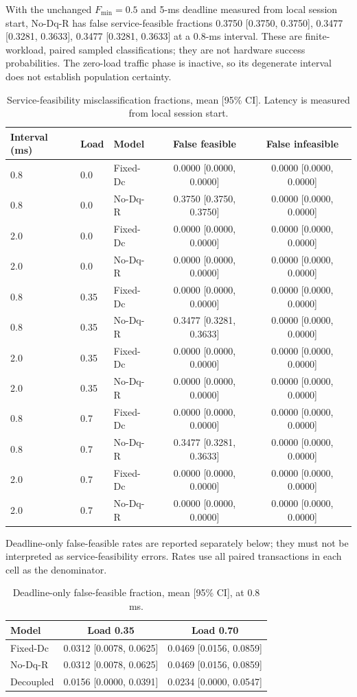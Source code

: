 With the unchanged $F_{\min}=0.5$ and 5-ms deadline measured from local session start, No-Dq-R has false service-feasible fractions 0.3750 [0.3750, 0.3750], 0.3477 [0.3281, 0.3633], 0.3477 [0.3281, 0.3633] at a 0.8-ms interval. These are finite-workload, paired sampled classifications; they are not hardware success probabilities. The zero-load traffic phase is inactive, so its degenerate interval does not establish population certainty.

\begin{table}[t]
\centering
\caption{Service-feasibility misclassification fractions, mean [95\% CI]. Latency is measured from local session start.}
\begin{tabular}{lllcc}
\hline
Interval (ms) & Load & Model & False feasible & False infeasible \\
\hline
0.8 & 0.0 & Fixed-Dc & 0.0000 [0.0000, 0.0000] & 0.0000 [0.0000, 0.0000] \\
0.8 & 0.0 & No-Dq-R & 0.3750 [0.3750, 0.3750] & 0.0000 [0.0000, 0.0000] \\
2.0 & 0.0 & Fixed-Dc & 0.0000 [0.0000, 0.0000] & 0.0000 [0.0000, 0.0000] \\
2.0 & 0.0 & No-Dq-R & 0.0000 [0.0000, 0.0000] & 0.0000 [0.0000, 0.0000] \\
0.8 & 0.35 & Fixed-Dc & 0.0000 [0.0000, 0.0000] & 0.0000 [0.0000, 0.0000] \\
0.8 & 0.35 & No-Dq-R & 0.3477 [0.3281, 0.3633] & 0.0000 [0.0000, 0.0000] \\
2.0 & 0.35 & Fixed-Dc & 0.0000 [0.0000, 0.0000] & 0.0000 [0.0000, 0.0000] \\
2.0 & 0.35 & No-Dq-R & 0.0000 [0.0000, 0.0000] & 0.0000 [0.0000, 0.0000] \\
0.8 & 0.7 & Fixed-Dc & 0.0000 [0.0000, 0.0000] & 0.0000 [0.0000, 0.0000] \\
0.8 & 0.7 & No-Dq-R & 0.3477 [0.3281, 0.3633] & 0.0000 [0.0000, 0.0000] \\
2.0 & 0.7 & Fixed-Dc & 0.0000 [0.0000, 0.0000] & 0.0000 [0.0000, 0.0000] \\
2.0 & 0.7 & No-Dq-R & 0.0000 [0.0000, 0.0000] & 0.0000 [0.0000, 0.0000] \\
\hline
\end{tabular}
\end{table}

Deadline-only false-feasible rates are reported separately below; they must not be interpreted as service-feasibility errors. Rates use all paired transactions in each cell as the denominator.

\begin{table}[t]
\centering
\caption{Deadline-only false-feasible fraction, mean [95\% CI], at 0.8 ms.}
\begin{tabular}{lcc}
\hline
Model & Load 0.35 & Load 0.70 \\
\hline
Fixed-Dc & 0.0312 [0.0078, 0.0625] & 0.0469 [0.0156, 0.0859] \\
No-Dq-R & 0.0312 [0.0078, 0.0625] & 0.0469 [0.0156, 0.0859] \\
Decoupled & 0.0156 [0.0000, 0.0391] & 0.0234 [0.0000, 0.0547] \\
\hline
\end{tabular}
\end{table}
